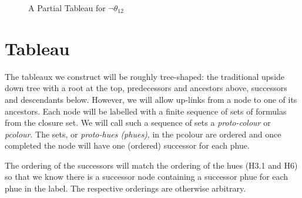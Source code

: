\documentclass[submission,copyright,creativecommons]{eptcs}
\begin{document}
\begin{figure}
\begin{center}

  
\end{center}
\caption{A Partial Tableau for $\neg \theta_{12}$}
\label{fig:egn12}
\end{figure}



\section{Tableau}
\label{sec:tableau}
\newcommand{\rot}{\mbox{\bf root}}

The tableaux we construct will be 
roughly tree-shaped:
the traditional upside down tree
with a root at the top,
predecessors and ancestors above,
successors and descendants below.
However, we will allow
up-links from a node
to one of its ancestors.
Each node will be labelled with a 
finite sequence of sets of formulas from the closure set.
We will call such a sequence of sets a
{\em proto-colour} or {\em pcolour}.
The sets, or {\em proto-hues (phues)}, in the pcolour
are ordered
and once completed
the node will have one (ordered) successor
for each phue.

The ordering of the successors
will match the ordering of the hues
(H3.1 and H6)
so that we know there
is a successor node
containing a successor phue
for each phue in the label.
The respective orderings
are otherwise arbitrary.
\end{document}
